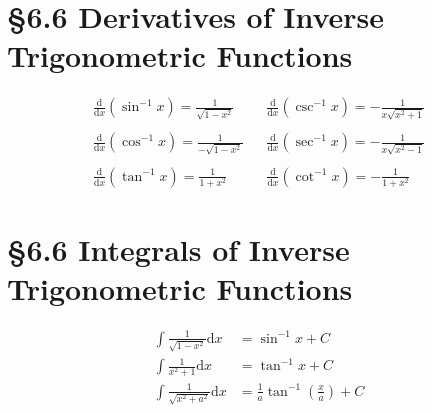 \newcommand{\dox}{\frac{\mathrm{d}}{\mathrm{d}x}}
\newcommand{\doxP}[1]{\dox\left({#1}\right)}
\newcommand{\lnp}[1]{\ln\left({#1}\right)}
\newcommand{\eqWithMsg}[1]{\overset{{#1}}{=\joinrel=}}
\newcommand{\longEqWithMsg}[1]{\xlongequal{\!{#1}\!}}
\newcommand{\tabspace}{\;\;\;} %
\newcommand{\xtabspace}{\tabspace\tabspace\tabspace\tabspace} %
\DeclareRobustCommand\iff{\;\Longleftrightarrow\;}


\section*{\S{6.6} Derivatives of Inverse Trigonometric Functions}
\begin{equation}
\begin{split}
    \doxP{\sin^{-1} x} = \frac{1}{\sqrt{1 - x^2}} \tabspace& \doxP{\csc^{-1} x} = -\frac{1}{x\sqrt{x^2 + 1}} \\\\
    \doxP{\cos^{-1} x} = \frac{1}{-\sqrt{1 - x^2}} \tabspace& \doxP{\sec^{-1} x} = -\frac{1}{x\sqrt{x^2 - 1}} \\\\
    \doxP{\tan^{-1} x} = \frac{1}{1 + x^2} \tabspace& \doxP{\cot^{-1} x} = -\frac{1}{1 + x^2}
\end{split}
\end{equation}

\section*{\S{6.6} Integrals of Inverse Trigonometric Functions}
\begin{equation}
\begin{split}
    \int \frac{1}{\sqrt{1 - x^2}} \mathrm{d}x &= \sin^{-1} x + C \\
    \int \frac{1}{x^2 + 1} \mathrm{d}x &= \tan^{-1} x + C \\
    \int \frac{1}{\sqrt{x^2 + a^2}} \mathrm{d}x &= \frac{1}{a}\tan^{-1}\left(\frac{x}{a}\right) + C
\end{split}
\end{equation}

